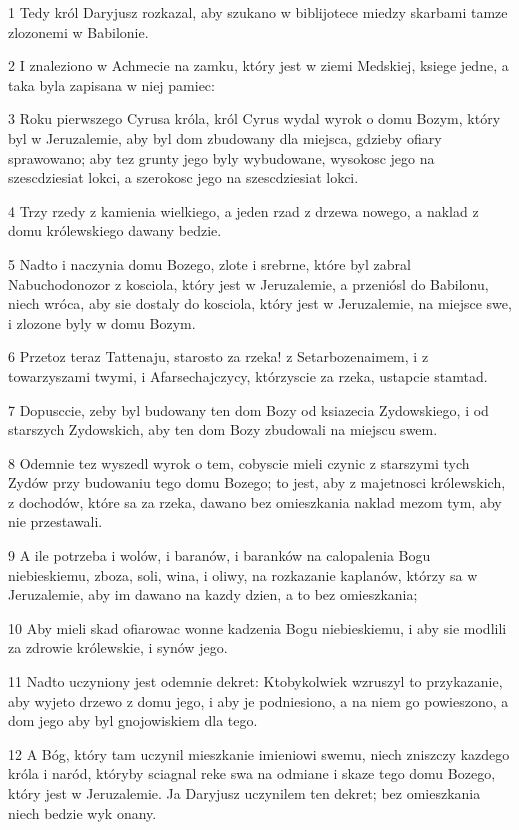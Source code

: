 \par 1 Tedy król Daryjusz rozkazal, aby szukano w biblijotece miedzy skarbami tamze zlozonemi w Babilonie.
\par 2 I znaleziono w Achmecie na zamku, który jest w ziemi Medskiej, ksiege jedne, a taka byla zapisana w niej pamiec:
\par 3 Roku pierwszego Cyrusa króla, król Cyrus wydal wyrok o domu Bozym, który byl w Jeruzalemie, aby byl dom zbudowany dla miejsca, gdzieby ofiary sprawowano; aby tez grunty jego byly wybudowane, wysokosc jego na szescdziesiat lokci, a szerokosc jego na szescdziesiat lokci.
\par 4 Trzy rzedy z kamienia wielkiego, a jeden rzad z drzewa nowego, a naklad z domu królewskiego dawany bedzie.
\par 5 Nadto i naczynia domu Bozego, zlote i srebrne, które byl zabral Nabuchodonozor z kosciola, który jest w Jeruzalemie, a przeniósl do Babilonu, niech wróca, aby sie dostaly do kosciola, który jest w Jeruzalemie, na miejsce swe, i zlozone byly w domu Bozym.
\par 6 Przetoz teraz Tattenaju, starosto za rzeka! z Setarbozenaimem, i z towarzyszami twymi, i Afarsechajczycy, którzyscie za rzeka, ustapcie stamtad.
\par 7 Dopusccie, zeby byl budowany ten dom Bozy od ksiazecia Zydowskiego, i od starszych Zydowskich, aby ten dom Bozy zbudowali na miejscu swem.
\par 8 Odemnie tez wyszedl wyrok o tem, cobyscie mieli czynic z starszymi tych Zydów przy budowaniu tego domu Bozego; to jest, aby z majetnosci królewskich, z dochodów, które sa za rzeka, dawano bez omieszkania naklad mezom tym, aby nie przestawali.
\par 9 A ile potrzeba i wolów, i baranów, i baranków na calopalenia Bogu niebieskiemu, zboza, soli, wina, i oliwy, na rozkazanie kaplanów, którzy sa w Jeruzalemie, aby im dawano na kazdy dzien, a to bez omieszkania;
\par 10 Aby mieli skad ofiarowac wonne kadzenia Bogu niebieskiemu, i aby sie modlili za zdrowie królewskie, i synów jego.
\par 11 Nadto uczyniony jest odemnie dekret: Ktobykolwiek wzruszyl to przykazanie, aby wyjeto drzewo z domu jego, i aby je podniesiono, a na niem go powieszono, a dom jego aby byl gnojowiskiem dla tego.
\par 12 A Bóg, który tam uczynil mieszkanie imieniowi swemu, niech zniszczy kazdego króla i naród, któryby sciagnal reke swa na odmiane i skaze tego domu Bozego, który jest w Jeruzalemie. Ja Daryjusz uczynilem ten dekret; bez omieszkania niech bedzie wyk onany.
